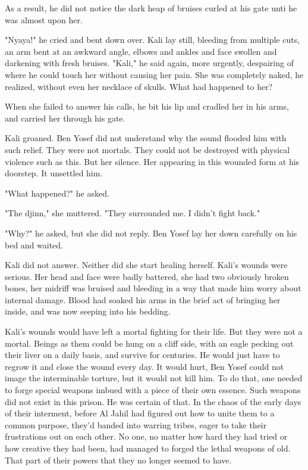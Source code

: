\documentclass{amsart}
\begin{document}
As a result, he did not notice the dark heap of bruises curled at his gate unti he was almost upon her. 

"Nyaya!" he cried and bent down over. Kali lay still, bleeding from multiple cuts, an arm bent at an awkward angle, elbows and ankles and face swollen and darkening with fresh bruises. "Kali," he said again, more urgently, despairing of where he could touch her without causing her pain. She was completely naked, he realized, without even her necklace of skulls. What had happened to her?
	
When she failed to answer his calls, he bit his lip and cradled her in his arms, and carried her through his gate. 

Kali groaned. Ben Yosef did not understand why the sound flooded him with such relief. They were not mortals. They could not be destroyed with physical violence such as this. But her silence. Her appearing in this wounded form at his doorstep. It unsettled him. 

"What happened?" he asked. 

"The djinn," she muttered. "They surrounded me. I didn't fight back." 

"Why?" he asked, but she did not reply. Ben Yosef lay her down carefully on his bed and waited. 

Kali did not answer. Neither did she start healing herself. Kali's wounds were serious. Her head and face were badly battered, she had two obviously broken bones, her midriff was bruised and bleeding in a way that made him worry about internal damage. Blood had soaked his arms in the brief act of bringing her inside, and was now seeping into his bedding. 

Kali's wounds would have left a mortal fighting for their life. But they were not a mortal. Beings as them could be hung on a cliff side, with an eagle pecking out their liver on a daily basis, and survive for centuries. He would just have to regrow it and close the wound every day. It would hurt, Ben Yosef could not image the interminable torture, but it would not kill him. To do that, one needed to forge special weapons imbued with a piece of their own essence. Such weapons did not exist in this prison. He was certain of that. In the chaos of the early days of their interment, before Al Jahil had figured out how to unite them to a common purpose, they'd banded into warring tribes, eager to take their frustrations out on each other. No one, no matter how hard they had tried or how creative they had been, had managed to forged the lethal weapons of old. That part of their powers that they no longer seemed to have.
\end{document}
